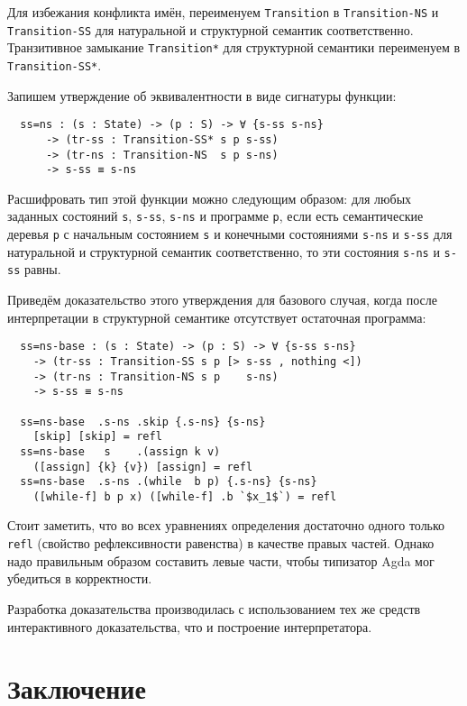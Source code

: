 \documentclass[aps,12pt,final,oneside,onecolumn,musixtex,superscriptaddress,centertags]{article}
\newcommand{\lcode}[1]{\lstinline[basicstyle=\ttfamily\normalsize]{#1}}
\begin{document}
  Для избежания конфликта имён, переименуем \lcode{Transition} в \lcode{Transition-NS} и \lcode{Transition-SS} для натуральной и структурной семантик соответственно. Транзитивное замыкание \lcode{Transition*} для структурной семантики переименуем в \lcode{Transition-SS*}.

  Запишем утверждение об эквивалентности в виде сигнатуры функции:
  \begin{lstlisting}
  ss=ns : (s : State) -> (p : S) -> ∀ {s-ss s-ns}
      -> (tr-ss : Transition-SS* s p s-ss)
      -> (tr-ns : Transition-NS  s p s-ns)
      -> s-ss ≡ s-ns
  \end{lstlisting}

  Расшифровать тип этой функции можно следующим образом: для любых заданных состояний \lcode{s}, \lcode{s-ss}, \lcode{s-ns} и программе \lcode{p}, если есть семантические деревья \lcode{p} с начальным состоянием \lcode{s} и конечными состояниями \lcode{s-ns} и \lcode{s-ss} для натуральной и структурной семантик соответственно, то эти состояния \lcode{s-ns} и \lcode{s-ss} равны.

  Приведём доказательство этого утверждения для базового случая, когда после интерпретации в структурной семантике отсутствует остаточная программа:
  \begin{lstlisting}
  ss=ns-base : (s : State) -> (p : S) -> ∀ {s-ss s-ns}
    -> (tr-ss : Transition-SS s p [> s-ss , nothing <])
    -> (tr-ns : Transition-NS s p    s-ns)
    -> s-ss ≡ s-ns

  ss=ns-base  .s-ns .skip {.s-ns} {s-ns}
    [skip] [skip] = refl
  ss=ns-base   s    .(assign k v)
    ([assign] {k} {v}) [assign] = refl
  ss=ns-base  .s-ns .(while  b p) {.s-ns} {s-ns}
    ([while-f] b p x) ([while-f] .b `$x_1$`) = refl
  \end{lstlisting}

  Стоит заметить, что во всех уравнениях определения достаточно одного только \lcode{refl} (свойство рефлексивности равенства) в качестве правых частей. Однако надо правильным образом составить левые части, чтобы типизатор Agda мог убедиться в корректности.

  Разработка доказательства производилась с использованием тех же средств интерактивного доказательства, что и построение интерпретатора.

  \newpage
  \section*{Заключение}
\end{document}
